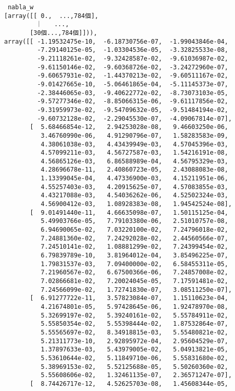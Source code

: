 \documentclass[11pt,a4j,fleqn]{jarticle}
\begin{document}
\begin{verbatim}
 nabla_w
[array([[ 0.,  ...,784個],
       　｜　　..., 
       [30個...,784個]])), 
array([[ -1.19532475e-10,  -6.18730756e-07,  -1.99043846e-04,
         -7.29140125e-05,  -1.03304536e-05,  -3.32825533e-08,
         -9.21118261e-02,  -9.32428587e-02,  -9.61036987e-02,
         -9.61150146e-02,  -9.60368726e-02,  -3.24272960e-07,
         -9.60657931e-02,  -1.44370213e-02,  -9.60511167e-02,
         -9.01427665e-10,  -5.06461865e-04,  -5.11145373e-07,
         -2.38446065e-03,  -9.40622772e-02,  -8.73073103e-05,
         -9.57277346e-02,  -8.85066315e-06,  -9.61117856e-02,
         -9.31959973e-02,  -9.54709632e-05,  -9.51484194e-02,
         -9.60732128e-02,  -2.29045530e-07,  -4.09067814e-07],
       [  5.68466854e-12,   2.94253028e-08,   9.46603250e-06,
          3.46760990e-06,   4.91290796e-07,   1.58283583e-09,
          4.38061038e-03,   4.43439949e-03,   4.57045396e-03,
          4.57099211e-03,   4.56727587e-03,   1.54216191e-08,
          4.56865126e-03,   6.86588989e-04,   4.56795329e-03,
          4.28696678e-11,   2.40860723e-05,   2.43088083e-08,
          1.13399045e-04,   4.47336900e-03,   4.15211951e-06,
          4.55257403e-03,   4.20915625e-07,   4.57083855e-03,
          4.43217088e-03,   4.54036262e-06,   4.52502324e-03,
          4.56900412e-03,   1.08928383e-08,   1.94542524e-08],
       [  9.01491440e-11,   4.66635098e-07,   1.50115125e-04,
          5.49903766e-05,   7.79103380e-06,   2.51010757e-08,
          6.94690065e-02,   7.03220100e-02,   7.24796018e-02,
          7.24881360e-02,   7.24292028e-02,   2.44560566e-07,
          7.24510141e-02,   1.08881299e-02,   7.24399454e-02,
          6.79839789e-10,   3.81964012e-04,   3.85496225e-07,
          1.79831537e-03,   7.09400000e-02,   6.58455311e-05,
          7.21960567e-02,   6.67500366e-06,   7.24857008e-02,
          7.02866681e-02,   7.20024045e-05,   7.17591481e-02,
          7.24566099e-02,   1.72741830e-07,   3.08511250e-07],
       [  6.91277722e-11,   3.57823084e-07,   1.15110623e-04,
          4.21674801e-05,   5.97428645e-06,   1.92478970e-08,
          5.32699197e-02,   5.39240161e-02,   5.55784911e-02,
          5.55850354e-02,   5.55398444e-02,   1.87532864e-07,
          5.55565697e-02,   8.34918815e-03,   5.55480821e-02,
          5.21311773e-10,   2.92895972e-04,   2.95604529e-07,
          1.37897633e-03,   5.43979005e-02,   5.04913821e-05,
          5.53610644e-02,   5.11849710e-06,   5.55831680e-02,
          5.38969153e-02,   5.52125688e-05,   5.50260360e-02,
          5.55608606e-02,   1.32461135e-07,   2.36571247e-07],
       [  8.74426717e-12,   4.52625703e-08,   1.45608344e-05,

\end{verbatim}
\end{document}
